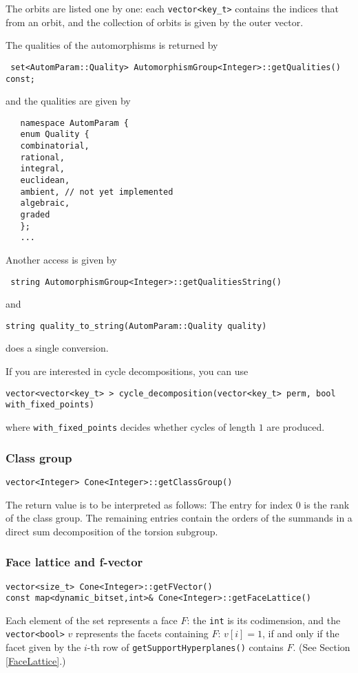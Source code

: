 \documentclass[12pt,a4paper]{scrartcl}
\theoremstyle{definition}
\begin{document}
\begin{small}
 The orbits are listed one by one: each \verb|vector<key_t>| contains the indices that from an orbit, and the collection of orbits is given by the outer vector.
  
  The qualities of the automorphisms is returned by  
  \begin{Verbatim}
 set<AutomParam::Quality> AutomorphismGroup<Integer>::getQualities() const;
   \end{Verbatim}
   and the qualities are given by   
   \begin{Verbatim} 
   namespace AutomParam {
   enum Quality {    
   combinatorial,
   rational,
   integral,
   euclidean,
   ambient, // not yet implemented
   algebraic,
   graded
   };
   ...
\end{Verbatim}
  Another access is given by
\begin{Verbatim}
 string AutomorphismGroup<Integer>::getQualitiesString()
 \end{Verbatim}
 and 
\begin{Verbatim}
string quality_to_string(AutomParam::Quality quality)
\end{Verbatim}
does a single conversion.

If you are interested in cycle decompositions, you can use
\begin{Verbatim}
vector<vector<key_t> > cycle_decomposition(vector<key_t> perm, bool with_fixed_points)
 \end{Verbatim}
 where \verb|with_fixed_points| decides whether cycles of length $1$ are produced.
 
\subsubsection{Class group}

\begin{Verbatim}
vector<Integer> Cone<Integer>::getClassGroup()
\end{Verbatim}
The return value is to be interpreted as follows: The entry for index $0$ is the rank of the class group. The remaining entries contain the orders of the summands in a direct sum decomposition of the torsion subgroup.

\subsubsection{Face lattice and f-vector}
\begin{Verbatim}
vector<size_t> Cone<Integer>::getFVector()
const map<dynamic_bitset,int>& Cone<Integer>::getFaceLattice()
\end{Verbatim}
Each element of the set represents a face $F$: the \verb|int| is its codimension, and the \verb|vector<bool>| $v$ represents the facets containing $F$: $v[i]=1$, if and only if the  facet given by the $i$-th row of \verb|getSupportHyperplanes()| contains $F$. (See Section \ref{FaceLattice}.)


\end{small}
\end{document}

